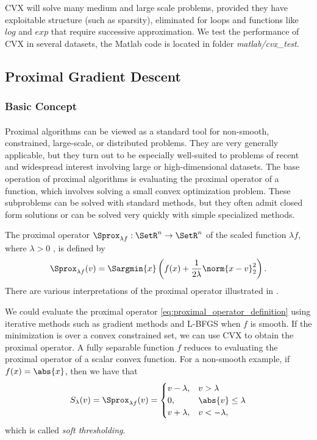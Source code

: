 \documentclass[
10pt, %
a4paper, %
oneside, %
headinclude,footinclude, %
BCOR5mm, %
]{scrartcl}
\begin{document}
CVX will solve many medium and large scale problems, provided they have 
exploitable structure (such as sparsity), eliminated for loops and functions 
like $log$ and $exp$ that require successive approximation. We test the 
performance of CVX in several datasets, the Matlab code is located in 
folder \textit{matlab/cvx\_test}.




\subsection{Proximal Gradient Descent} \label{sec:proximal_algorithm}
\subsubsection{Basic Concept} 
\paragraph{}
Proximal algorithms can be viewed as a standard 
tool for non-smooth, constrained, large-scale, or distributed problems. They 
are very generally applicable, but they turn out to be especially well-suited 
to problems of recent and widespread interest involving large or 
high-dimensional datasets. The base operation of proximal algorithms is 
evaluating the proximal operator of a function, which involves solving a small 
convex optimization problem. These subproblems can be solved with standard 
methods, but they often admit closed form solutions or can be solved very 
quickly with simple specialized methods.  

The proximal operator $\Sprox_{\lambda f}: \SetR^n \to \SetR^n $ of 
the scaled function $ \lambda f $, where $ \lambda > 0 $ , is defined by 
\begin{equation} \label{eq:proximal_operator_definition}
	\Sprox_{\lambda f}(v) = \Sargmin{x}
	\left( f(x) + \frac{1}{2\lambda}\norm{x - v}_2^2 \right).
\end{equation}
There are various interpretations of the proximal operator illustrated in 
\cite{parikh2013proximal}. 

We could evaluate the proximal operator \eqref{eq:proximal_operator_definition} 
using iterative methods such as gradient methods and L-BFGS when $f$ is smooth. 
If the minimization is over a convex constrained set, we can use CVX to obtain 
the proximal operator. A fully separable function $f$ reduces to evaluating the 
proximal operator of a scalar convex function. For a non-smooth example, if 
$f(x) = \abs{x}$, then we have that
\begin{align} \label{eq:soft_thresholding}
	S_{\lambda}(v) = \Sprox_{\lambda f}(v) = 
	\begin{cases} 
		v - \lambda, & v > \lambda \\ 
		0,		    & \abs{v} \leq \lambda \\ 
		v + \lambda, & v < -\lambda,
	\end{cases} 
\end{align}
which is called \textit{soft thresholding}.
\end{document}
